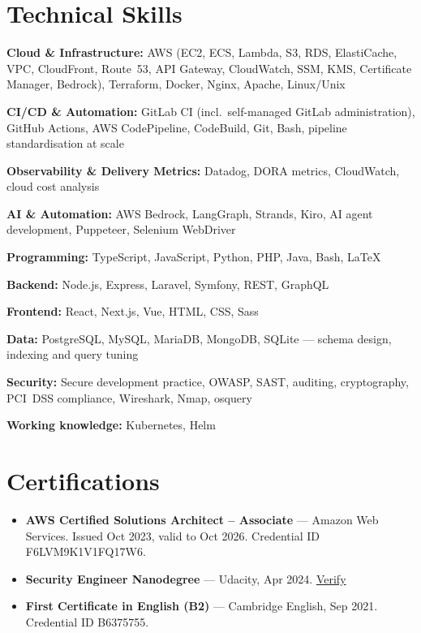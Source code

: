 \documentclass[10pt,a4paper]{article}
\newcommand{\skillline}[2]{\noindent\textbf{#1:} #2\par\vspace{0.22em}}
\begin{document}
\section*{Technical Skills}
\skillline{Cloud \& Infrastructure}{AWS (EC2, ECS, Lambda, S3, RDS, ElastiCache, VPC,
CloudFront, Route~53, API Gateway, CloudWatch, SSM, KMS, Certificate Manager, Bedrock),
Terraform, Docker, Nginx, Apache, Linux/Unix}
\skillline{CI/CD \& Automation}{GitLab CI (incl.\ self-managed GitLab administration),
GitHub Actions, AWS CodePipeline, CodeBuild, Git, Bash, pipeline
standardisation at scale}
\skillline{Observability \& Delivery Metrics}{Datadog, DORA metrics, CloudWatch,
cloud cost analysis}
\skillline{AI \& Automation}{AWS Bedrock, LangGraph, Strands, Kiro, AI agent development,
Puppeteer, Selenium WebDriver}
\skillline{Programming}{TypeScript, JavaScript, Python, PHP, Java, Bash, \LaTeX}
\skillline{Backend}{Node.js, Express, Laravel, Symfony, REST, GraphQL}
\skillline{Frontend}{React, Next.js, Vue, HTML, CSS, Sass}
\skillline{Data}{PostgreSQL, MySQL, MariaDB, MongoDB, SQLite --- schema design, indexing
and query tuning}
\skillline{Security}{Secure development practice, OWASP, SAST, auditing, cryptography,
PCI~DSS compliance, Wireshark, Nmap, osquery}
\skillline{Working knowledge}{Kubernetes, Helm}

\section*{Certifications}
\begin{itemize}
  \item \textbf{AWS Certified Solutions Architect -- Associate} --- Amazon Web Services.
  Issued Oct 2023, valid to Oct 2026. Credential ID F6LVM9K1V1FQ17W6.
  \item \textbf{Security Engineer Nanodegree} --- Udacity, Apr 2024.
  \href{https://confirm.udacity.com/e/76a1644a-98f6-11ee-aa42-eba581f8d839}{Verify}
  \item \textbf{First Certificate in English (B2)} --- Cambridge English, Sep 2021.
  Credential ID B6375755.
\end{itemize}
\end{document}
